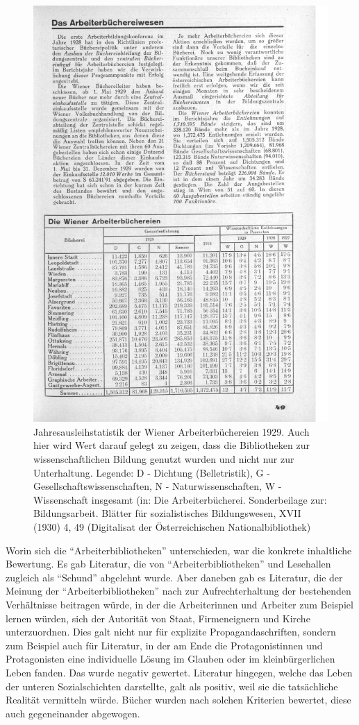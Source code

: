 \documentclass[a4paper,
fontsize=11pt,
oneside,
numbers=noperiodatend,
parskip=half-,
bibliography=totoc,
final
]{scrartcl}
\begin{document}
\begin{figure}
\centering
\includegraphics[width=.8\textwidth]{img/Schuldt04.jpg}
\caption{Jahresausleihstatistik der Wiener Arbeiterbüchereien 1929. Auch
hier wird Wert darauf gelegt zu zeigen, dass die Bibliotheken zur
wissenschaftlichen Bildung genutzt wurden und nicht nur zur
Unterhaltung. Legende: D - Dichtung (Belletristik), G -
Gesellschaftswissenschaften, N - Naturwissenschaften, W - Wissenschaft
insgesamt (in: Die Arbeiterbücherei. Sonderbeilage zur: Bildungsarbeit.
Blätter für sozialistisches Bildungswesen, XVII (1930) 4, 49
(Digitalisat der Österreichischen Nationalbibliothek)}
\end{figure}

Worin sich die \enquote{Arbeiterbibliotheken} unterschieden, war die
konkrete inhaltliche Bewertung. Es gab Literatur, die von
\enquote{Arbeiterbibliotheken} und Lesehallen zugleich als
\enquote{Schund} abgelehnt wurde. Aber daneben gab es Literatur, die der
Meinung der \enquote{Arbeiterbibliotheken} nach zur Aufrechterhaltung
der bestehenden Verhältnisse beitragen würde, in der die Arbeiterinnen
und Arbeiter zum Beispiel lernen würden, sich der Autorität von Staat,
Firmeneignern und Kirche unterzuordnen. Dies galt nicht nur für
explizite Propagandaschriften, sondern zum Beispiel auch für Literatur,
in der am Ende die Protagonistinnen und Protagonisten eine individuelle
Lösung im Glauben oder im kleinbürgerlichen Leben fanden. Das wurde
negativ gewertet. Literatur hingegen, welche das Leben der unteren
Sozialschichten darstellte, galt als positiv, weil sie die tatsächliche
Realität vermitteln würde. Bücher wurden nach solchen Kriterien
bewertet, diese auch gegeneinander abgewogen.
\end{document}
